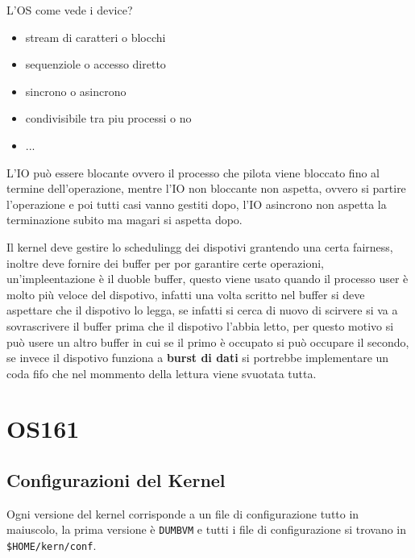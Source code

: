 \documentclass[12pt]{article}
\begin{document}
L'OS come vede i device?
\begin{itemize}
  \item stream di caratteri o blocchi
  \item sequenziole o accesso diretto
  \item sincrono o asincrono
  \item condivisibile tra piu processi o no
  \item ...
\end{itemize}

L'IO pu\`o essere blocante ovvero il processo che pilota viene bloccato fino al termine dell'operazione, mentre l'IO non bloccante non aspetta, ovvero si partire l'operazione e poi tutti casi vanno gestiti dopo, l'IO asincrono non aspetta la terminazione subito ma magari si aspetta dopo.

Il kernel deve gestire lo schedulingg dei dispotivi grantendo una certa fairness, inoltre deve fornire dei buffer per por garantire certe operazioni, un'impleentazione \`e il duoble buffer, questo viene usato quando il processo user \`e molto pi\`u veloce del dispotivo, infatti una volta scritto nel buffer si deve aspettare che il dispotivo lo legga, se infatti si cerca di nuovo di scirvere si va a sovrascrivere il buffer prima che il dispotivo l'abbia letto, per questo motivo si pu\`o usere un altro buffer in cui se il primo \`e occupato si pu\`o occupare il secondo, se invece il dispotivo funziona a \textbf{burst di dati} si portrebbe implementare un coda fifo che nel mommento della lettura viene svuotata tutta.












\newpage
\section{OS161}
\subsection{Configurazioni del Kernel}
Ogni versione del kernel corrisponde a un file di configurazione tutto in maiuscolo, la prima versione \`e \texttt{DUMBVM} e tutti i file di configurazione si trovano in \texttt{\$HOME/kern/conf}.
\end{document}
